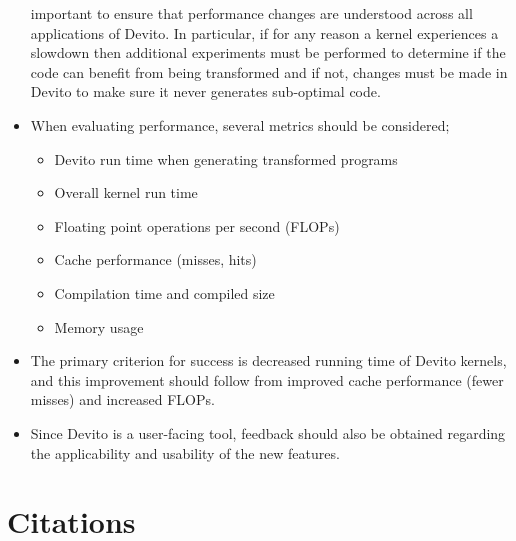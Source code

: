 \documentclass[a4paper,12pt,twoside]{report}
\begin{document}
\begin{itemize}
        important to ensure that performance changes are understood across all applications of Devito. In particular, if for any reason a kernel experiences a slowdown
        then additional experiments must be performed to determine if the code can benefit from being transformed and if not, changes must be made in Devito to make sure
        it never generates sub-optimal code.
    \item When evaluating performance, several metrics should be considered;
        \begin{itemize}
            \item Devito run time when generating transformed programs
            \item Overall kernel run time
            \item Floating point operations per second (FLOPs)
            \item Cache performance (misses, hits)
            \item Compilation time and compiled size
            \item Memory usage
        \end{itemize}
    \item The primary criterion for success is decreased running time of Devito kernels, and this improvement should follow from improved cache performance 
        (fewer misses) and increased FLOPs.
    \item Since Devito is a user-facing tool, feedback should also be obtained regarding the applicability and usability of the new features.
\end{itemize}

\chapter{Citations}


\end{document}

